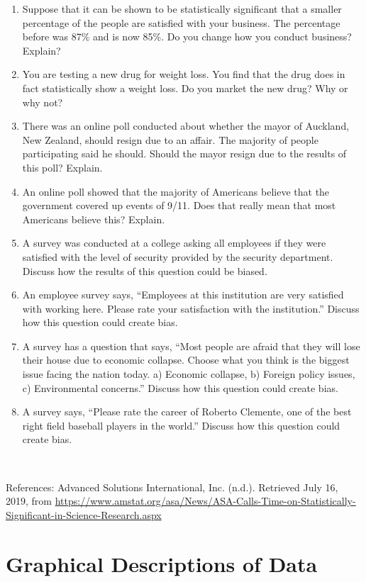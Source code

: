 \documentclass[]{book}
\begin{document}
\begin{enumerate}
\item
  Suppose that it can be shown to be statistically significant that a smaller percentage of the people are satisfied with your business. The percentage before was 87\% and is now 85\%. Do you change how you conduct business? Explain?
\item
  You are testing a new drug for weight loss. You find that the drug does in fact statistically show a weight loss. Do you market the new drug? Why or why not?
\item
  There was an online poll conducted about whether the mayor of
  Auckland, New Zealand, should resign due to an affair. The majority of people participating said he should. Should the mayor resign due to the results of this poll? Explain.
\item
  An online poll showed that the majority of Americans believe that the government covered up events of 9/11. Does that really mean that most Americans believe this? Explain.
\item
  A survey was conducted at a college asking all employees if they were satisfied with the level of security provided by the security department. Discuss how the results of this question could be biased.
\item
  An employee survey says, ``Employees at this institution are very satisfied with working here. Please rate your satisfaction with the institution.'' Discuss how this question could create bias.
\item
  A survey has a question that says, ``Most people are afraid that they will lose their house due to economic collapse. Choose what you think is the biggest issue facing the nation today. a) Economic collapse, b) Foreign policy issues, c) Environmental concerns.'' Discuss how this question could create bias.
\item
  A survey says, ``Please rate the career of Roberto Clemente, one of the best right field baseball players in the world.'' Discuss how this question could create bias.
\end{enumerate}

\emph{\\
}

References:
Advanced Solutions International, Inc. (n.d.). Retrieved July 16, 2019, from \url{https://www.amstat.org/asa/News/ASA-Calls-Time-on-Statistically-Significant-in-Science-Research.aspx}

\hypertarget{graphical-descriptions-of-data}{%
\chapter{Graphical Descriptions of Data}\label{graphical-descriptions-of-data}}
\end{document}
